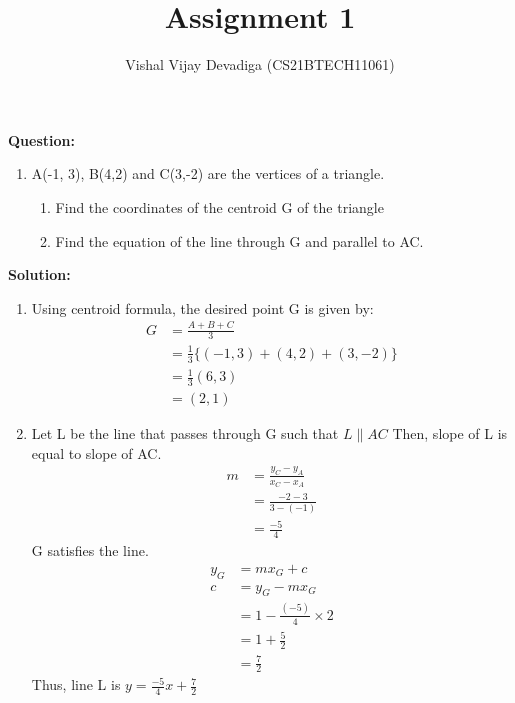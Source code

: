 \documentclass[12pt, a4paper]{article}
\newcommand{\solution}{\noindent \textbf{Solution: }}
\newcommand{\question}{\noindent \textbf{Question: }}
\begin{document}
\title{Assignment 1}
\author{Vishal Vijay Devadiga (CS21BTECH11061)}
\maketitle
\question
\begin{enumerate}[label=]
\item A(-1, 3), B(4,2) and C(3,-2) are the vertices of a triangle.
\begin{enumerate}
    \item Find the coordinates of the centroid G of the triangle
    \item Find the equation of the line through G and parallel to AC.
\end{enumerate}
\end{enumerate}
\solution
\begin{enumerate}
\item Using centroid formula,
    the desired point G is given by:
    \begin{align*}
        G&= \frac{A + B + C}{3}
        \\
        &= \frac{1}{3}\{(-1,3)+(4,2)+(3,-2)\}
        \\
        &=\frac{1}{3}(6,3)
        \\
        &=(2,1)
    \end{align*}
\item Let L be the line that passes through G such that $L \parallel AC$
    Then, slope of L is equal to slope of AC.
    \begin{align*}
        m&= \frac{y_C - y_A}{x_C - x_A}
        \\
        &= \frac{-2 - 3}{3 - (-1)}
        \\
        &=\frac{-5}{4}
    \end{align*}
    G satisfies the line.
    \begin{align*}
        y_G&= mx_G + c
        \\
        c&= y_G - mx_G
        \\
        &= 1 - \frac{(-5)}{4} \times 2
        \\
        &= 1 + \frac{5}{2}
        \\
        &= \frac{7}{2}
    \end{align*}
    Thus, line L is $y = \frac{-5}{4}x + \frac{7}{2}$
\end{enumerate}
\end{document}
